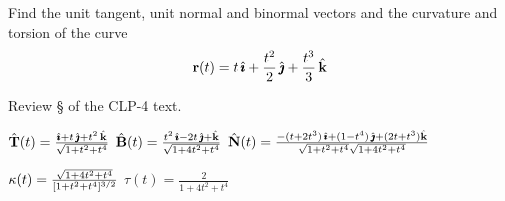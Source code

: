 \begin{question}
Find the unit tangent, unit normal and binormal vectors and
the curvature and torsion of the curve
\begin{equation*}
\mathbf{r}(t)=t\,\hat{\pmb{\imath}} + \frac{t^2}{2}\,\hat{\pmb{\jmath}} + \frac{t^3}{3}\,\hat{\mathbf{k}}
\end{equation*}
\end{question}

\begin{hint} 
Review \S{} of the CLP-4 text.
\end{hint}

\begin{answer} 
$\hat{\mathbf{T}}(t)=\frac{\hat{\pmb{\imath}} + t\,\hat{\pmb{\jmath}} + t^2\,\hat{\mathbf{k}}}{\sqrt{1+t^2+t^4}}$\qquad
$\hat{\mathbf{B}}(t)=\frac{t^2\,\hat{\pmb{\imath}}-2t\,\hat{\pmb{\jmath}}+\hat{\mathbf{k}}}{\sqrt{1+4t^2+t^4}}$\qquad
$\hat{\mathbf{N}}(t)=\frac{-(t+2t^3)\,\hat{\pmb{\imath}}+(1-t^4)\,\hat{\pmb{\jmath}}+(2t+t^3)\hat{\mathbf{k}}}
            {\sqrt{1+t^2+t^4}\sqrt{1+4t^2+t^4}}$

$\kappa(t)=\frac{\sqrt{1+4t^2+t^4}}{[1+t^2+t^4]^{3/2}}$\qquad
$\tau(t)=\frac{2}{1+4t^2+t^4}$
\end{answer}


